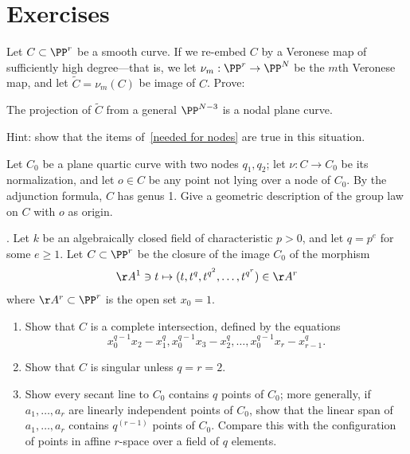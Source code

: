 \section{Exercises}

\begin{exercise}
Let $C\subset \PP^r$ be a smooth curve. If we re-embed $C$ by a Veronese map of sufficiently high degree---that is, we let $\nu_m : \PP^r \to \PP^N$ be the $m$th Veronese map, and let $\widetilde C = \nu_m(C)$ be image of $C$. Prove:

\begin{proposition}\label{positive characteristic nodes}
The projection of $\widetilde C$ from a general $\PP^{N-3}$ is a nodal plane curve.
\end{proposition}

Hint: show that the items of~\ref{needed for nodes}  are true in this situation.
\end{exercise}

\begin{exercise}
Let $C_0$ be a plane quartic curve with two nodes $q_1, q_2$; let $\nu : C \to C_0$ be its normalization, and let $o \in C$ be any point not lying over a node of $C_0$.
By the adjunction formula, $C$ has genus 1. Give a geometric description
of the group law on $C$ with $o$ as origin.
\end{exercise}

\begin{exercise}\label{strange curves} \cite{Rathmann}. Let $k$ be an algebraically closed field of characteristic $p>0$, and let $q=p^e$ for some $e\geq 1$. Let $C\subset \PP^r$
be the closure of the image $C_0$ of the morphism
$$
\AA^1 \ni t \mapsto (t, t^q, t^{q^2}, \dots , t^{q^{r}}) \in \AA^r
$$
where $\AA^r\subset \PP^r$ is the open set $x_0=1$. 
\begin{enumerate}
\item Show that $C$ is a complete intersection, defined by the equations
$$
x_0^{q-1}x_2 - x_1^q, x_0^{q-1}x_3 - x_2^q,\dots, 
x_0^{q-1}x_r - x_{r-1}^q.
$$
\item Show that $C$ is singular unless $q = r = 2$.
\item Show every secant line to $C_0$ contains $q$ points of $C_0$; more generally, if
$a_1, \dots, a_r$ are linearly independent points of $C_0$, show that the linear span of
$a_1, \dots, a_r$ contains $q^{(r-1)}$ points of $C_0$.  Compare this with the configuration of
points in affine $r$-space over a field of $q$ elements.
\end{enumerate}
\end{exercise}

